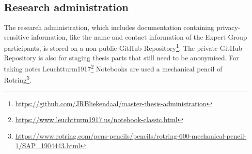 \subsection{Research administration}
\label{sub:tbresearchadministration}
The research administration, which includes documentation containing privacy-sensitive information, like the name and contact information of the Expert Group participants, is stored on a non-public GitHub Repository\footnote{\url{https://github.com/JRBliekendaal/master-thesis-administration}}. The private GitHub Repository is also for staging thesis parts that still need to be anonymised. For taking notes Leuchtturm1917\footnote{\url{https://www.leuchtturm1917.us/notebook-classic.html}} Notebooks are used a mechanical pencil of Rotring\footnote{\url{https://www.rotring.com/pens-pencils/pencils/rotring-600-mechanical-pencil-1/SAP_1904443.html}}.
